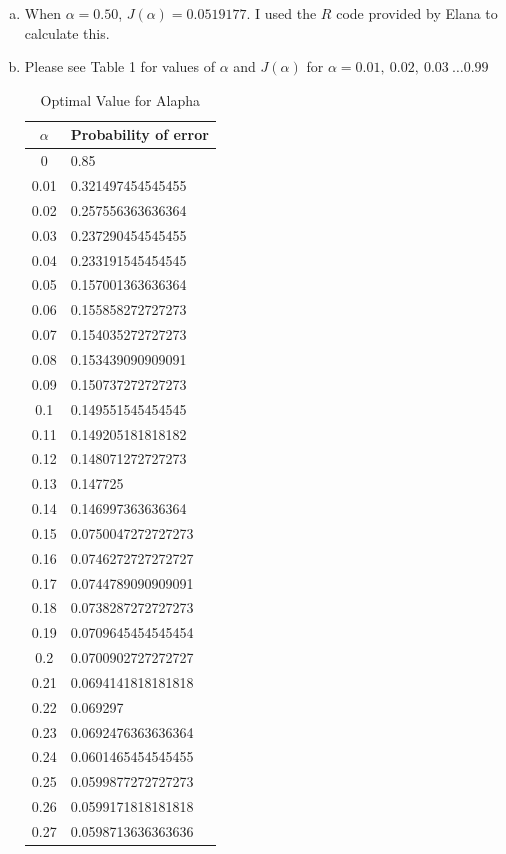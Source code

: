 \documentclass[11pt]{extarticle}
\begin{document}
\begin{enumerate}[(a)]
\item When $\alpha=0.50$, $J(\alpha) = 0.0519177$. I used the $R$ code provided by Elana to calculate this. 

\item Please see Table 1 for values of $\alpha$ and $J(\alpha)$ for $\alpha = 0.01,\ 0.02,\ 0.03\ \dots 0.99$

\begin{table}[ht!]
\centering
\label{al}
\caption{Optimal Value  for Alapha}
\tiny
\begin{minipage}{0.5\textwidth}
\centering
\begin{tabular}{cl}
\toprule
\textbf{$\alpha$} & \textbf{Probability of error} \\
\midrule
0 & 0.85 \\
0.01 & 0.321497454545455 \\
0.02 & 0.257556363636364 \\
0.03 & 0.237290454545455 \\
0.04 & 0.233191545454545 \\
0.05 & 0.157001363636364 \\
0.06 & 0.155858272727273 \\
0.07 & 0.154035272727273 \\
0.08 & 0.153439090909091 \\
0.09 & 0.150737272727273 \\
0.1 & 0.149551545454545 \\
0.11 & 0.149205181818182 \\
0.12 & 0.148071272727273 \\
0.13 & 0.147725 \\
0.14 & 0.146997363636364 \\
0.15 & 0.0750047272727273 \\
0.16 & 0.0746272727272727 \\
0.17 & 0.0744789090909091 \\
0.18 & 0.0738287272727273 \\
0.19 & 0.0709645454545454 \\
0.2 & 0.0700902727272727 \\
0.21 & 0.0694141818181818 \\
0.22 & 0.069297 \\
0.23 & 0.0692476363636364 \\
0.24 & 0.0601465454545455 \\
0.25 & 0.0599877272727273 \\
0.26 & 0.0599171818181818 \\
0.27 & 0.0598713636363636 \\

\end{tabular}
\end{minipage}
\end{table}
\end{enumerate}
\end{document}
